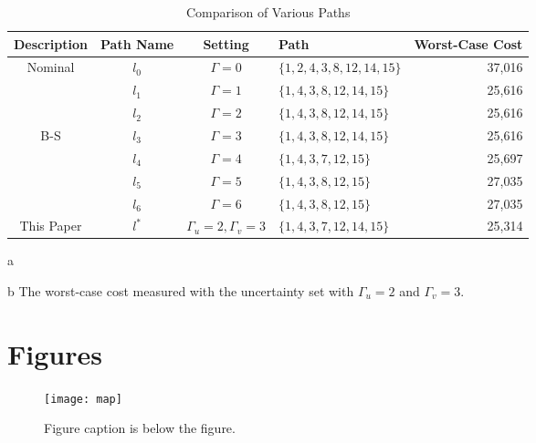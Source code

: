 \documentclass[letterpaper, 11pt]{article}
\begin{document}
\begin{table} \centering
\begin{threeparttable}
\caption{Comparison of Various Paths}
\label{table:threeparttable}
    \begin{tabular}{ccclr}
    \toprule
    Description & Path Name & Setting & Path & Worst-Case Cost \tnote{b} \\
    \midrule
    Nominal
         & $l_0$ & $\Gamma=0$ & $\{1,2,4,3,8,12,14,15\}$ & 37,016 \\
    \midrule
         & $l_1$ & $\Gamma=1$ & $\{1,4,3,8,12,14,15\}$ & 25,616 \\
         & $l_2$ & $\Gamma=2$ & $\{1,4,3,8,12,14,15\}$ & 25,616 \\
    B-S\tnote{a}
         & $l_3$ & $\Gamma=3$ & $\{1,4,3,8,12,14,15\}$ & 25,616 \\
         & $l_4$ & $\Gamma=4$ & $\{1,4,3,7,12,15\}$ & 25,697 \\
         & $l_5$ & $\Gamma=5$ & $\{1,4,3,8,12,15\}$ & 27,035 \\
         & $l_6$ & $\Gamma=6$ & $\{1,4,3,8,12,15\}$ & 27,035 \\
    \midrule
    This Paper
         & $l^*$ & $\Gamma_u=2, \Gamma_v=3$ & $\{1,4,3,7,12,14,15\}$ & 25,314 \\
    \bottomrule
    \end{tabular}
    \begin{tablenotes}
        \item [a] \citet{Bertsimas2003network}
        \item [b] The worst-case cost measured with the uncertainty set with $\Gamma_u=2$ and $\Gamma_v=3$.
    \end{tablenotes}
\end{threeparttable}
\end{table}














\section{Figures} \label{sec:figures}


\begin{figure} \centering
\texttt{[image: map]}
\caption{Figure caption is below the figure.}
\label{fig:map}
\end{figure}
\end{document}
